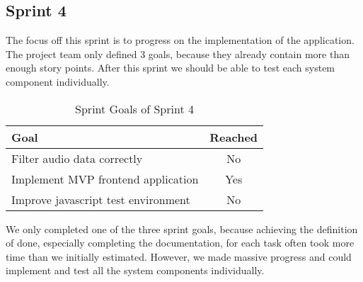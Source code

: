 \subsection{Sprint 4}\label{subsec:sprint-4}
The focus off this sprint is to progress on the implementation of the application.
The project team only defined 3 goals, because they already contain more than enough story points.
After this sprint we should be able to test each system component individually.
\begin{table}[H]
    \centering
    \begin{tabularx}{\textwidth}{X c}
        \toprule
        \textbf{Goal}                                         & \textbf{Reached} \\
        \midrule
        Filter audio data correctly                           & No               \\
        \midrule
        Implement MVP frontend application                    & Yes              \\
        \midrule
        Improve javascript test environment                   & No               \\
        \bottomrule
    \end{tabularx}
    \caption{Sprint Goals of Sprint 4}\label{tab:sprint_goals4}
\end{table}
We only completed one of the three sprint goals, because achieving the definition of done, especially completing the documentation,
for each task often took more time than we initially estimated.
However, we made massive progress and could implement and test all the system components individually.

